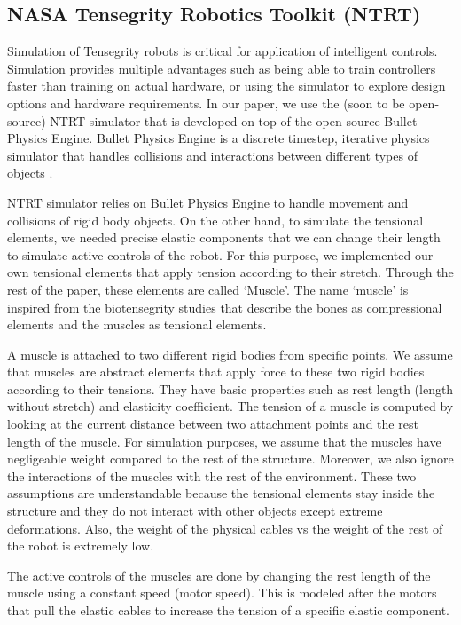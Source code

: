 \documentclass[twocolumn,10pt]{asme2ej}
\begin{document}
\subsection{NASA Tensegrity Robotics Toolkit (NTRT)}

Simulation of Tensegrity robots is critical for application of intelligent controls. Simulation provides multiple advantages such as being able to train controllers faster than training on actual hardware, or using the simulator to explore design options and hardware requirements. In our paper, we use the (soon to be open-source) NTRT \cite{NTRT-web} simulator that is developed on top of the open source Bullet Physics Engine. Bullet Physics Engine is a discrete timestep, iterative physics simulator that handles collisions and interactions between different types of objects \cite{bullet}.

NTRT simulator relies on Bullet Physics Engine to handle movement and collisions of rigid body objects. On the other hand, to simulate the tensional elements, we needed precise elastic components that we can change their length to simulate active controls of the robot. For this purpose, we implemented our own tensional elements that apply tension according to their stretch. Through the rest of the paper, these elements are called `Muscle'. The name `muscle' is inspired from the biotensegrity studies that describe the bones as compressional elements and the muscles as tensional elements. 

A muscle is attached to two different rigid bodies from specific points. We assume that muscles are abstract elements that apply force to these two rigid bodies according to their tensions. They have basic properties such as rest length (length without stretch) and elasticity coefficient. The tension of a muscle is computed by looking at the current distance between two attachment points and the rest length of the muscle. For simulation purposes, we assume that the muscles have negligeable weight compared to the rest of the structure. Moreover, we also ignore the interactions of the muscles with the rest of the environment. These two assumptions are understandable because the tensional elements stay inside the structure and they do not interact with other objects except extreme deformations. Also, the weight of the physical cables vs the weight of the rest of the robot is extremely low.

The active controls of the muscles are done by changing the rest length of the muscle using a constant speed (motor speed). This is modeled after the motors that pull the elastic cables to increase the tension of a specific elastic component. 
\end{document}
